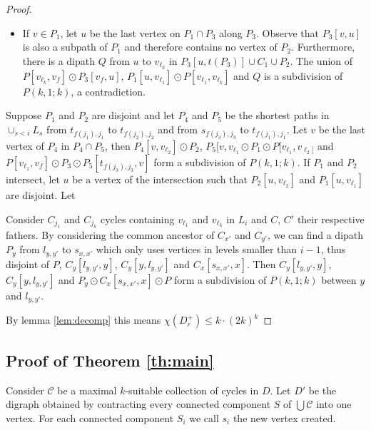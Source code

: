 \documentclass[utf8,10pt]{article}
\theoremstyle{plain}
\theoremstyle{definition}
\theoremstyle{remark}
\newcommand{\dr}{ k \cdot (2k)^k}
\begin{document}
\begin{proof}
\begin{itemize}
\begin{itemize}
	\item If $v\in P_1$, let $u$ be the last vertex on $P_1\cap P_3$ along $P_3$.  Observe that $P_3[v,u]$ is also a subpath of $P_1$ and therefore contains no vertex of $P_2$. Furthermore, there is a dipath $Q$ from $u$ to $v_{\ell_k}$ in $P_3[u, t(P_3)]\cup C_1\cup  P_2$.
	The union of $P[v_{\ell_k}, v_f] \odot P_3[v_f,u]$, $P_1[u, v_{\ell_1}]\odot P[v_{\ell_1}, v_{\ell_k}]$ and $Q$ is a subdivision of $P(k,1;k)$, a contradiction.

	\end{itemize}

\end{itemize}









Suppose $P_1$ and $P_2$ are disjoint and let $P_4$ and $P_5$ be the shortest paths in $\cup_{s < i} L_s$ 
from $t_{f(j_1),j_1}$ to $t_{f(j_2),j_2}$
and from $s_{f(j_3),j_3}$ to $t_{f(j_1),j_1}$. Let $v$ be the last vertex of $P_4$ in $P_4 \cap P_5$, then $P_4[v,v_{\ell_2}] \odot P_2$,
$P_5[v, v_{\ell_1} \odot P_1 \odot P[v_{\ell_1}, v_{\ell_2]}$ and $P[v_{\ell_1}, v_f] \odot P_3 \odot P_5[t_{f(j_3),j_3}, v]$
form a subdivision of $P(k,1;k)$.
If $P_1$ and $P_2$ intersect, let $u$ be a vertex of the intersection such that $P_2[u, v_{\ell_2}]$ and $P_1[u, v_{\ell_1}]$ are disjoint.
Let%



Consider $C_{j_1}$ and $C_{j_k}$ cycles containing $v_{\ell_1}$ and $v_{\ell_k}$ in $L_i$ and $C$, $C'$ their respective fathers. 
By considering the common ancestor of $C_{x'}$ and $C_{y'}$, we can find a dipath $P_y$ from $l_{y,y'}$ to $s_{x,x'}$ which 
only uses vertices in levels smaller than $i-1$, thus disjoint of $P$, $C_y[l_{y,y'}, y]$, $C_y[y, l_{y,y'}]$ and $C_x[s_{x,x'}, x]$. 
Then $C_y[l_{y,y'}, y]$, $C_y[y, l_{y,y'}]$ and $P_y \odot C_x[s_{x,x'}, x] \odot P$ form a subdivision of $P(k,1;k)$ between $y$ 
and $l_{y,y'}$. 

By lemma \ref{lem:decomp} this means $\chi(D_r^+) \leq  \dr$ 

\end{proof}

\subsection{Proof of Theorem \ref{th:main}}

Consider $\mathcal{C}$ be a maximal $k$-suitable collection of cycles in $D$. Let $D'$ be the digraph obtained by contracting 
every connected component $S$ of $\bigcup \mathcal{C}$ into one vertex. For each connected component $S_i$ we call $s_i$ the
new vertex created.
\end{document}
